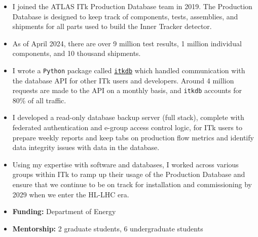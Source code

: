 \begin{itemize}
	\setlength{\itemsep}{0em}
	\item I joined the ATLAS ITk Production Database team in 2019. The Production Database is designed to keep track of components, tests, assemblies, and shipments for all parts used to build the Inner Tracker detector.
	\item As of April 2024, there are over 9 million test results, 1 million individual components, and 10 thousand shipments.
	\item I wrote a \texttt{Python} package called \href{https://itkdb.docs.cern.ch/latest/}{\texttt{itkdb}} which handled communication with the database API for other ITk users and developers. Around 4 million requests are made to the API on a monthly basis, and \texttt{itkdb} accounts for 80\% of all traffic.
	\item I developed a read-only database backup server (full stack), complete with federated authentication and e-group access control logic, for ITk users to prepare weekly reports and keep tabs on production flow metrics and identify data integrity issues with data in the database.
	\item Using my expertise with software and databases, I worked across various groups within ITk to ramp up their usage of the Production Database and ensure that we continue to be on track for installation and commissioning by 2029 when we enter the HL-LHC era.
	\item \textbf{Funding:} Department of Energy
	\item \textbf{Mentorship:} 2 graduate students, 6 undergraduate students
\end{itemize}

\\

